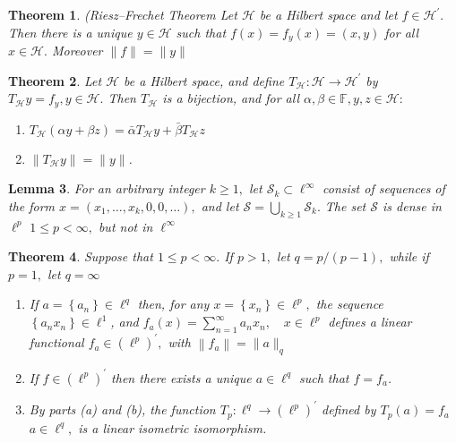 \documentclass[10pt]{paper}
\newtheorem{theorem}{Theorem}[section]
\newtheorem{lemma}[theorem]{Lemma}
\begin{document}
\begin{theorem}{(Riesz–Frechet Theorem}
    Let $\mathcal{H}$ be a Hilbert space and let $f \in \mathcal{H}^{\prime} .$ Then there is a unique $y \in \mathcal{H}$ such that $f(x)=f_{y}(x)=(x, y)$ for all $x \in \mathcal{H} .$ Moreover $\|f\|=\|y\|$
\end{theorem}

\begin{theorem}
    Let $\mathcal{H}$ be a Hilbert space, and define $T_{\mathcal{H}}: \mathcal{H} \rightarrow \mathcal{H}^{\prime}$ by $T_{\mathcal{H}} y=f_{y}, y \in \mathcal{H} .$ Then
    $T_{\mathcal{H}}$ is a bijection, and for all $\alpha, \beta \in \mathbb{F}, y, z \in \mathcal{H}:$
    \begin{enumerate}
        \item $T_{\mathcal{H}}(\alpha y+\beta z)=\bar{\alpha} T_{\mathcal{H}} y+\bar{\beta} T_{\mathcal{H}} z$
        \item $\left\|T_{\mathcal{H}} y\right\|=\|y\|$.
    \end{enumerate}
\end{theorem}

\begin{lemma}
    For an arbitrary integer $k \geq 1,$ let $\mathcal{S}_{k} \subset \ell^{\infty}$ consist of sequences of the form $x=\left(x_{1}, \ldots, x_{k}, 0,0, \ldots\right),$ and let $\mathcal{S}=\bigcup_{k \geq 1} \mathcal{S}_{k} .$ The set $\mathcal{S}$ is dense in $\ell^{p}$ $1 \leq p<\infty,$ but not in $\ell^{\infty}$
\end{lemma}

\begin{theorem}
    Suppose that $1 \leq p<\infty .$ If $p>1,$ let $q=p /(p-1),$ while if $p=1,$ let $q=\infty$
    \begin{enumerate}
        \item If $a=\left\{a_{n}\right\} \in \ell^{q}$ then, for any $x=\left\{x_{n}\right\} \in \ell^{p},$ the sequence $\left\{a_{n} x_{n}\right\} \in \ell^{1}$, and $f_{a}(x)=\sum_{n=1}^{\infty} a_{n} x_{n}, \quad x \in \ell^{p}$
              defines a linear functional $f_{a} \in\left(\ell^{p}\right)^{\prime},$ with $\left\|f_{a}\right\|=\|a\|_{q}$
        \item If $f \in\left(\ell^{p}\right)^{\prime}$ then there exists a unique $a \in \ell^{q}$ such that $f=f_{a}$.
        \item By parts (a) and (b), the function $T_{p}: \ell^{q} \rightarrow\left(\ell^{p}\right)^{\prime}$ defined by $T_{p}(a)=f_{a}$ $a \in \ell^{q},$ is a linear isometric isomorphism.
    \end{enumerate}
\end{theorem}
\end{document}

